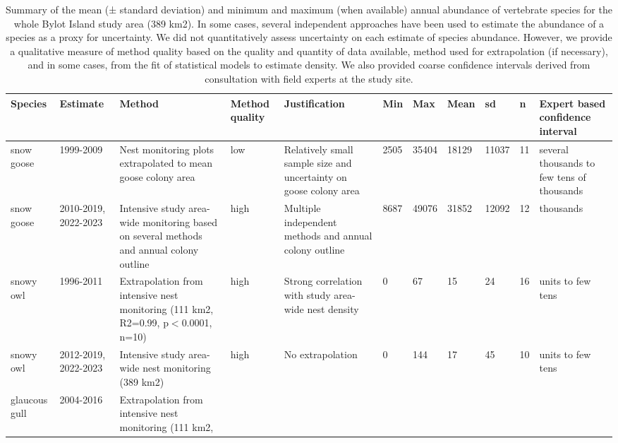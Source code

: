 \begingroup\fontsize{8pt}{10pt}\selectfont
\begin{longtable}{|p{}|p{}|p{}|p{}|p{}|p{}|p{}|p{}|p{}|p{}|p{}|}
\caption{Summary of the mean (± standard deviation) and minimum and maximum (when available) annual abundance of vertebrate species for the whole Bylot Island study area (389 km2).  In some cases, several independent approaches have been used to estimate the abundance of a species as a proxy for uncertainty. We did not quantitatively assess uncertainty on each estimate of species abundance. However, we provide a qualitative measure of method quality based on the quality and quantity of data available, method used for extrapolation (if necessary), and in some cases, from the fit of statistical models to estimate density. We also provided coarse confidence intervals derived from consultation with field experts at the study site.} \\ 
  \hline
{\textbf{Species}} & {\textbf{Estimate}} & {\textbf{Method}} & {\textbf{Method quality}} & {\textbf{Justification}} & {\textbf{Min}} & {\textbf{Max}} & {\textbf{Mean}} & {\textbf{sd}} & {\textbf{n}} & {\textbf{Expert based confidence interval}} \\ 
  \hline
snow goose & 1999-2009 & Nest monitoring plots extrapolated to mean goose colony area & low & Relatively small sample size and uncertainty on goose colony area  & 2505 & 35404 & 18129 & 11037 &  11 & several thousands to few tens of thousands \\ 
   \hline
snow goose & 2010-2019, 2022-2023 & Intensive study area-wide monitoring based on several
methods and annual colony outline & high & Multiple independent methods and annual colony outline & 8687 & 49076 & 31852 & 12092 &  12 & thousands \\ 
   \hline
snowy owl & 1996-2011 & Extrapolation from intensive nest monitoring (111 km2,
R2=0.99, p$<$0.0001, n=10) & high & Strong correlation with study area-wide nest density &   0 &  67 & 15 & 24 &  16 & units to few tens \\ 
   \hline
snowy owl & 2012-2019, 2022-2023 & Intensive study area-wide nest monitoring (389 km2) & high & No extrapolation &   0 & 144 & 17 & 45 &  10 & units to few tens \\ 
   \hline
glaucous gull & 2004-2016 & Extrapolation from intensive nest monitoring (111 km2,

\end{longtable}
